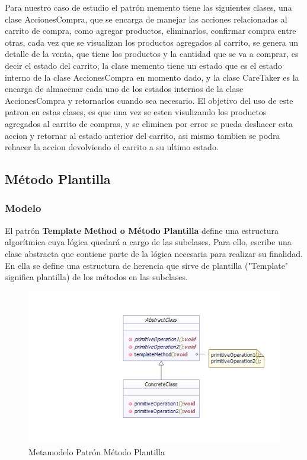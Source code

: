 Para nuestro caso de estudio el patrón memento tiene las siguientes clases, una clase AccionesCompra, que se encarga de manejar las acciones relacionadas al carrito de compra, como agregar productos, eliminarlos, confirmar compra entre otras, cada vez que se visualizan los productos agregados al carrito, se genera un detalle de la venta, que tiene los productos y la cantidad que se va a comprar, es decir el estado del carrito, la clase memento tiene un estado que es el estado interno de la clase AccionesCompra en momento dado, y la clase CareTaker es la encarga de almacenar cada uno de los estados internos de la clase AccionesCompra y retornarlos cuando sea necesario.\newline
El objetivo del uso de este patron en estas clases, es que una vez se esten visulizando los productos agregados al carrito de compras, y se eliminen por error se pueda deshacer esta accion y retornar al estado anterior del carrito, asi mismo tambien se podra rehacer la accion devolviendo el carrito a su ultimo estado.
\newpage

\subsection{Método Plantilla}
\subsubsection{Modelo}

El patrón \textbf{Template Method o Método Plantilla} define una estructura algorítmica cuya lógica quedará a cargo de las subclases. Para ello, escribe una clase abstracta que contiene parte de la lógica necesaria para realizar su finalidad. En ella se define una estructura de herencia que sirve de plantilla ("Template" significa plantilla) de los métodos en las subclases.

\begin{figure}[th!]
	\centering
	\includegraphics[width=0.6\linewidth]{arquitectura/imagenes/ModeloPlantilla}
	\caption{Metamodelo Patrón Método Plantilla}
	\label{fig:metamodelo patron metodo plantilla}
\end{figure}

